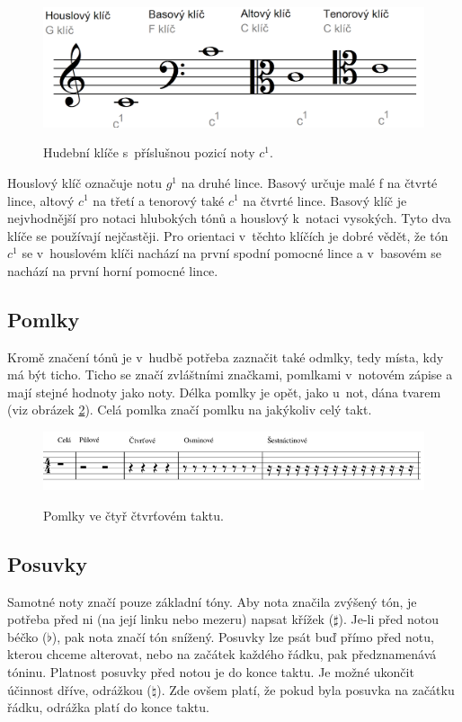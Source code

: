 \begin{figure}[h]\centering
    \centering
    \includegraphics[width=0.5\linewidth]{obrazky/Klíče.png}\\[1pt]  
    \caption{Hudební klíče s~příslušnou pozicí noty $c^1$.}    
    \label{obrazek4Klice}
\end{figure}

Houslový klíč označuje notu $g^1$ na druhé lince.
Basový určuje malé f na čtvrté lince, altový $c^1$ na třetí 
a tenorový také $c^1$ na čtvrté lince.
Basový klíč je nejvhodnější pro notaci hlubokých tónů 
a houslový k~notaci vysokých.
Tyto dva klíče se používají nejčastěji. 
Pro orientaci v~těchto klíčích je dobré vědět, že
tón $c^1$ se v~houslovém klíči nachází na první spodní pomocné lince 
a v~basovém se nachází na první horní pomocné lince.
\cite{cmiral,zenkl}
\par

\subsection{Pomlky}
Kromě značení tónů je v~hudbě potřeba zaznačit také odmlky,
tedy místa, kdy má být ticho.
Ticho se značí zvláštními značkami, pomlkami v~notovém zápise 
a mají stejné hodnoty jako noty.
Délka pomlky je opět, jako u~not, 
dána tvarem (viz obrázek \ref{obrazekPomlky}).
Celá pomlka značí pomlku na jakýkoliv celý takt.
\cite{cmiral,zenkl}

\begin{figure}[h]\centering
    \centering
    \includegraphics[width=0.7\linewidth]{obrazky/pomlky.png}\\[1pt]  
    \caption{Pomlky ve čtyř čtvrťovém taktu.}    
    \label{obrazekPomlky}
\end{figure}

\subsection{Posuvky}
\label{kapitolaPosuvky}
Samotné noty značí pouze základní tóny.
Aby nota značila zvýšený tón, 
je potřeba před ni (na její linku nebo mezeru) napsat křížek ($\sharp $).
Je-li před notou béčko ($\flat $), pak nota značí tón snížený.
Posuvky lze psát buď přímo před notu, kterou chceme alterovat, 
nebo na začátek každého řádku, pak předznamenává tóninu.
Platnost posuvky před notou je do konce taktu.
Je možné ukončit účinnost dříve, odrážkou ($\natural $).
Zde ovšem platí, že pokud byla posuvka na začátku řádku, 
odrážka platí do konce taktu.
\cite{cmiral,zenkl}

